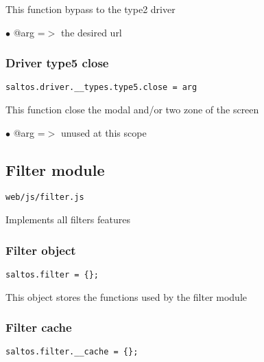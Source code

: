 \documentclass[a4paper]{article}
\begin{document}
This function bypass to the type2 driver

\begin{compactitem}
\item[\color{myblue}$\bullet$] @arg =$>$ the desired url
\end{compactitem}

\hypertarget{toc763}{}
\subsubsection{Driver type5 close}

\begin{lstlisting}
saltos.driver.__types.type5.close = arg
\end{lstlisting}

This function close the modal and/or two zone of the screen

\begin{compactitem}
\item[\color{myblue}$\bullet$] @arg =$>$ unused at this scope
\end{compactitem}

\hypertarget{toc764}{}
\subsection{Filter module}

\begin{lstlisting}
web/js/filter.js
\end{lstlisting}

Implements all filters features

\hypertarget{toc765}{}
\subsubsection{Filter object}

\begin{lstlisting}
saltos.filter = {};
\end{lstlisting}

This object stores the functions used by the filter module

\hypertarget{toc766}{}
\subsubsection{Filter cache}

\begin{lstlisting}
saltos.filter.__cache = {};
\end{lstlisting}
\end{document}
